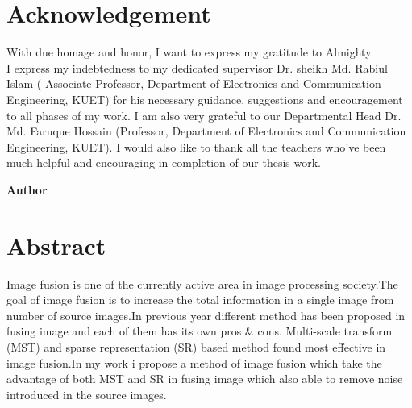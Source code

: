 \documentclass[12pt]{report}
\theoremstyle{plain}
\theoremstyle{definition}
\newcommand\textbox[1]{%
  \parbox{.333\textwidth}{#1}%
}
\begin{document}

\chapter*{Acknowledgement}
With due homage and honor, I want to express my gratitude to Almighty.\\


\noindent I express my indebtedness to my dedicated supervisor Dr. sheikh Md. Rabiul Islam ( Associate Professor, Department of Electronics and Communication Engineering, KUET) for his necessary guidance, suggestions and encouragement to all phases of my work. I am also very grateful to our Departmental Head Dr. Md. Faruque Hossain (Professor,  Department of Electronics and Communication Engineering, KUET). I would also like to thank all the teachers who've been much helpful and encouraging in completion of our thesis work.\\

\noindent\textbox{\hfill}\textbox{\hfil \hfil}\textbox{\hfill \textbf{Author}}

\chapter*{Abstract}
Image fusion is one of the currently active area in image processing society.The goal of image fusion is to increase the total information in a single image from number of source images.In previous year different method has been proposed in fusing image and each of them has its own pros \& cons. Multi-scale transform (MST) and sparse representation (SR) based method found most effective in image fusion.In my work i propose a method of image fusion which take the  advantage of both MST and SR in fusing image which also able to remove noise introduced in the source images.



\end{document}
